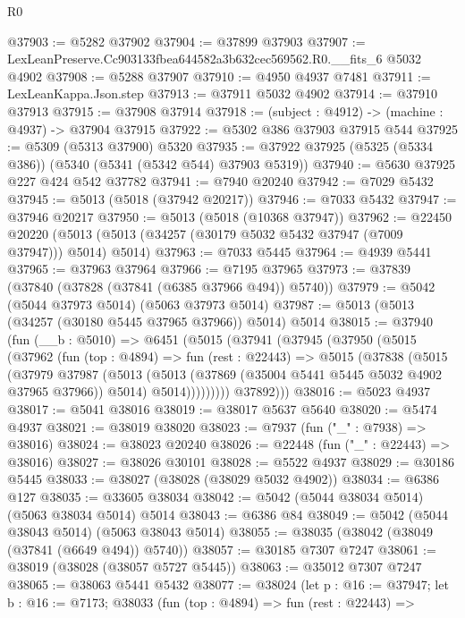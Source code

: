 \begin{lexlean}{R0}
\begin{coremodule}
@37903 := @5282 @37902
@37904 := @37899 @37903
@37907 := LexLeanPreserve.Cc903133fbea644582a3b632cec569562.R0.__fits_6 @5032 @4902
@37908 := @5288 @37907
@37910 := @4950 @4937 @7481
@37911 := LexLeanKappa.Json.step
@37913 := @37911 @5032 @4902
@37914 := @37910 @37913
@37915 := @37908 @37914
@37918 := (subject : @4912) -> (machine : @4937) -> @37904 @37915
@37922 := @5302 @386 @37903 @37915 @544
@37925 := @5309 (@5313 @37900) @5320
@37935 := @37922 @37925 (@5325 (@5334 @386)) (@5340 (@5341 (@5342 @544) @37903 @5319))
@37940 := @5630 @37925 @227 @424 @542 @37782
@37941 := @7940 @20240
@37942 := @7029 @5432
@37945 := @5013 (@5018 (@37942 @20217))
@37946 := @7033 @5432
@37947 := @37946 @20217
@37950 := @5013 (@5018 (@10368 @37947))
@37962 := @22450
    @20220
    (@5013 (@5013 (@34257 (@30179 @5032 @5432 @37947 (@7009 @37947))) @5014) @5014)
@37963 := @7033 @5445
@37964 := @4939 @5441
@37965 := @37963 @37964
@37966 := @7195 @37965
@37973 := @37839 (@37840 (@37828 (@37841 (@6385 @37966 @494)) @5740))
@37979 := @5042 (@5044 @37973 @5014) (@5063 @37973 @5014)
@37987 := @5013 (@5013 (@34257 (@30180 @5445 @37965 @37966)) @5014) @5014
@38015 := @37940
    (fun (__b : @5010) =>
    @6451
      (@5015
        (@37941
          (@37945
            (@37950
              (@5015
                (@37962
                  (fun (top : @4894) =>
                  fun (rest : @22443) =>
                  @5015
                    (@37838
                      (@5015
                        (@37979
                          @37987
                          (@5013
                            (@5013 (@37869 (@35004 @5441 @5445 @5032 @4902 @37965 @37966)) @5014)
                            @5014)))))))))
          @37892)))
@38016 := @5023 @4937
@38017 := @5041 @38016
@38019 := @38017 @5637 @5640
@38020 := @5474 @4937
@38021 := @38019 @38020
@38023 := @7937 (fun ("_" : @7938) => @38016)
@38024 := @38023 @20240
@38026 := @22448 (fun ("_" : @22443) => @38016)
@38027 := @38026 @30101
@38028 := @5522 @4937
@38029 := @30186 @5445
@38033 := @38027 (@38028 (@38029 @5032 @4902))
@38034 := @6386 @127
@38035 := @33605 @38034
@38042 := @5042 (@5044 @38034 @5014) (@5063 @38034 @5014) @5014
@38043 := @6386 @84
@38049 := @5042 (@5044 @38043 @5014) (@5063 @38043 @5014)
@38055 := @38035 (@38042 (@38049 (@37841 (@6649 @494)) @5740))
@38057 := @30185 @7307 @7247
@38061 := @38019 (@38028 (@38057 @5727 @5445))
@38063 := @35012 @7307 @7247
@38065 := @38063 @5441 @5432
@38077 := @38024
    (let p : @16 := @37947;
    let b : @16 := @7173;
    @38033
      (fun (top : @4894) =>
      fun (rest : @22443) =>

\end{coremodule}
\end{lexlean}
